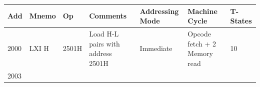 \documentclass[11pt,twocolumn]{article}
\begin{document}
\begin{longtable}[]{@{}lllllll@{}}
\toprule
\begin{minipage}[b]{0.04\columnwidth}\raggedright
Add\strut
\end{minipage} & \begin{minipage}[b]{0.05\columnwidth}\raggedright
Mnemo\strut
\end{minipage} & \begin{minipage}[b]{0.05\columnwidth}\raggedright
Op\strut
\end{minipage} & \begin{minipage}[b]{0.37\columnwidth}\raggedright
Comments\strut
\end{minipage} & \begin{minipage}[b]{0.09\columnwidth}\raggedright
Addressing Mode\strut
\end{minipage} & \begin{minipage}[b]{0.17\columnwidth}\raggedright
Machine Cycle\strut
\end{minipage} & \begin{minipage}[b]{0.05\columnwidth}\raggedright
T-States\strut
\end{minipage}\tabularnewline
\midrule
\endhead
\begin{minipage}[t]{0.04\columnwidth}\raggedright
2000\strut
\end{minipage} & \begin{minipage}[t]{0.05\columnwidth}\raggedright
LXI H\strut
\end{minipage} & \begin{minipage}[t]{0.05\columnwidth}\raggedright
2501H\strut
\end{minipage} & \begin{minipage}[t]{0.37\columnwidth}\raggedright
Load H-L pairs with address 2501H\strut
\end{minipage} & \begin{minipage}[t]{0.09\columnwidth}\raggedright
Immediate\strut
\end{minipage} & \begin{minipage}[t]{0.17\columnwidth}\raggedright
Opcode fetch + 2 Memory read\strut
\end{minipage} & \begin{minipage}[t]{0.05\columnwidth}\raggedright
10\strut
\end{minipage}\tabularnewline
\begin{minipage}[t]{0.04\columnwidth}\raggedright
2003\strut
\end{minipage} & \begin{minipage}[t]{0.05\columnwidth}\raggedright

\end{minipage}
\end{longtable}
\end{document}

